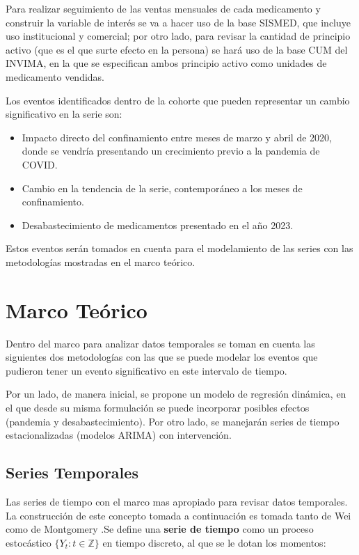\documentclass[10pt,twoside,xcolor=table,x11anmes]{IEEEtran}
\begin{document}
Para realizar seguimiento de las ventas mensuales de cada medicamento y construir la variable de interés se va a hacer uso de la base SISMED, que incluye uso institucional y comercial; por otro lado, para revisar la cantidad de principio activo (que es el que surte efecto en la persona) se hará uso de la base CUM del INVIMA, en la que se especifican ambos principio activo como unidades de medicamento vendidas.

Los eventos identificados dentro de la cohorte que pueden representar un cambio significativo en la serie son:

\begin{itemize}
    \item Impacto directo del confinamiento entre meses de marzo y abril de 2020, donde se vendría presentando un crecimiento previo a la pandemia de COVID.
    \item Cambio en la tendencia de la serie, contemporáneo a los meses de confinamiento.
    \item Desabastecimiento de medicamentos presentado en el año 2023.
\end{itemize}

Estos eventos serán tomados en cuenta para el modelamiento de las series con las metodologías mostradas en el marco teórico.

\section[Marco Teórico]{Marco Teórico}

Dentro del marco para analizar datos temporales se toman en cuenta las siguientes dos metodologías con las que se puede modelar los eventos que pudieron tener un evento significativo en este intervalo de tiempo. 

Por un lado, de manera inicial, se propone un modelo de regresión dinámica, en el que desde su misma formulación se puede incorporar posibles efectos (pandemia y desabastecimiento). Por otro lado, se manejarán series de tiempo estacionalizadas (modelos ARIMA) con intervención.

\subsection[Series Temporales]{Series Temporales}

Las series de tiempo con el marco mas apropiado para revisar datos temporales. La construcción de este concepto tomada a continuación es tomada tanto de Wei como de Montgomery .Se define una \textbf{serie de tiempo} como un proceso estocástico $ \{Y_t:t\in\mathbb{Z}\}$ en tiempo discreto, al que se le dotan los momentos:
\end{document}
